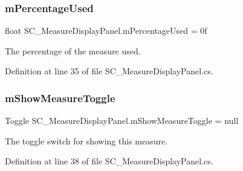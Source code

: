 \subsubsection{\texorpdfstring{m\+Percentage\+Used}{mPercentageUsed}}
{\footnotesize\ttfamily float S\+C\+\_\+\+Measure\+Display\+Panel.\+m\+Percentage\+Used = 0f\hspace{0.3cm}{\ttfamily [private]}}



The percentage of the measure used. 



Definition at line 35 of file S\+C\+\_\+\+Measure\+Display\+Panel.\+cs.

\mbox{\label{group___s_c___m_d_p_priv_var_gabec551ab0b79d269b028f4bc99e82b00}} 
\subsubsection{\texorpdfstring{m\+Show\+Measure\+Toggle}{mShowMeasureToggle}}
{\footnotesize\ttfamily Toggle S\+C\+\_\+\+Measure\+Display\+Panel.\+m\+Show\+Measure\+Toggle = null\hspace{0.3cm}{\ttfamily [private]}}



The toggle switch for showing this measure. 



Definition at line 38 of file S\+C\+\_\+\+Measure\+Display\+Panel.\+cs.

